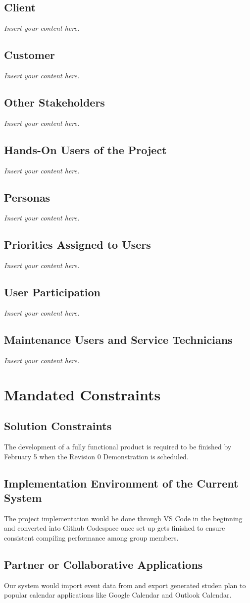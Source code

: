 \documentclass[12pt]{article}
\newcommand{\lips}{\textit{Insert your content here.}}
\begin{document}
\subsection{Client}
\lips
\subsection{Customer}
\lips
\subsection{Other Stakeholders}
\lips
\subsection{Hands-On Users of the Project}
\lips
\subsection{Personas}
\lips
\subsection{Priorities Assigned to Users}
\lips
\subsection{User Participation}
\lips
\subsection{Maintenance Users and Service Technicians}
\lips

\section{Mandated Constraints}
\subsection{Solution Constraints}
The development of a fully functional product is required to be finished by February 5 when the Revision 0 Demonstration is scheduled.
\subsection{Implementation Environment of the Current System}
The project implementation would be done through VS Code in the beginning and converted into Github Codespace once set up gets finished to ensure consistent compiling performance among group members.
\subsection{Partner or Collaborative Applications}
Our system would import event data from and export generated studen plan to popular calendar applications like Google Calendar and Outlook Calendar. 
\end{document}
